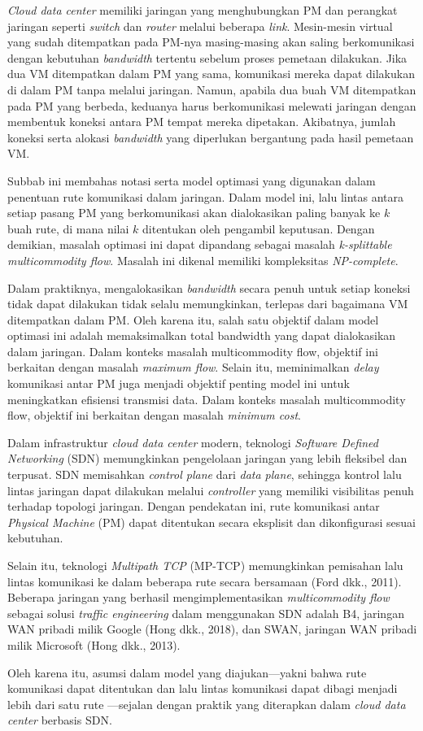 \textit{Cloud data center} memiliki jaringan yang menghubungkan PM dan perangkat jaringan seperti \textit{switch} dan \textit{router} melalui beberapa \textit{link}. Mesin-mesin virtual yang sudah ditempatkan pada PM-nya masing-masing akan saling berkomunikasi dengan kebutuhan \textit{bandwidth} tertentu sebelum proses pemetaan dilakukan. Jika dua VM ditempatkan dalam PM yang sama, komunikasi mereka dapat dilakukan di dalam PM tanpa melalui jaringan. Namun, apabila dua buah VM ditempatkan pada PM yang berbeda, keduanya harus berkomunikasi melewati jaringan dengan membentuk koneksi antara PM tempat mereka dipetakan. Akibatnya, jumlah koneksi serta alokasi \textit{bandwidth} yang diperlukan bergantung pada hasil pemetaan VM. 

Subbab ini membahas notasi serta model optimasi yang digunakan dalam penentuan rute komunikasi dalam jaringan. Dalam model ini, lalu lintas antara setiap pasang PM yang berkomunikasi akan dialokasikan paling banyak ke $k$ buah rute, di mana nilai $k$ ditentukan oleh pengambil keputusan. Dengan demikian, masalah optimasi ini dapat dipandang sebagai masalah \textit{k-splittable multicommodity flow}. Masalah ini dikenal memiliki kompleksitas \textit{NP-complete}. 

Dalam praktiknya, mengalokasikan \textit{bandwidth} secara penuh untuk setiap koneksi tidak dapat dilakukan tidak selalu memungkinkan, terlepas dari bagaimana VM ditempatkan dalam PM. Oleh karena itu, salah satu objektif dalam model optimasi ini adalah memaksimalkan total bandwidth yang dapat dialokasikan dalam jaringan. Dalam konteks masalah multicommodity flow, objektif ini berkaitan dengan masalah \textit{maximum flow}. Selain itu, meminimalkan \textit{delay} komunikasi antar PM juga menjadi objektif penting model ini untuk meningkatkan efisiensi transmisi data. Dalam konteks masalah multicommodity flow, objektif ini berkaitan dengan masalah \textit{minimum cost}.

Dalam infrastruktur \textit{cloud data center} modern, teknologi \textit{Software Defined Networking} (SDN) memungkinkan pengelolaan jaringan yang lebih fleksibel dan terpusat. SDN memisahkan \textit{control plane} dari \textit{data plane}, sehingga kontrol lalu lintas jaringan dapat dilakukan melalui \textit{controller} yang memiliki visibilitas penuh terhadap topologi jaringan. Dengan pendekatan ini, rute komunikasi antar \textit{Physical Machine} (PM) dapat ditentukan secara eksplisit dan dikonfigurasi sesuai kebutuhan. 

Selain itu, teknologi \textit{Multipath TCP} (MP-TCP) memungkinkan pemisahan lalu lintas komunikasi ke dalam beberapa rute secara bersamaan (Ford dkk., 2011). Beberapa jaringan yang berhasil mengimplementasikan \textit{multicommodity flow} sebagai solusi \textit{traffic engineering} dalam menggunakan SDN adalah B4, jaringan WAN pribadi milik Google (Hong dkk., 2018), dan SWAN, jaringan WAN pribadi milik Microsoft (Hong dkk., 2013).

Oleh karena itu, asumsi dalam model yang diajukan—yakni bahwa rute komunikasi dapat ditentukan dan lalu lintas komunikasi dapat dibagi menjadi  lebih dari satu rute —sejalan dengan praktik yang diterapkan dalam \textit{cloud data center} berbasis SDN.
